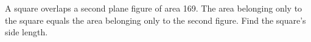 A square overlaps a second plane figure of area 169. The area belonging only to the square equals the area belonging only to the second figure. Find the square's side length.
